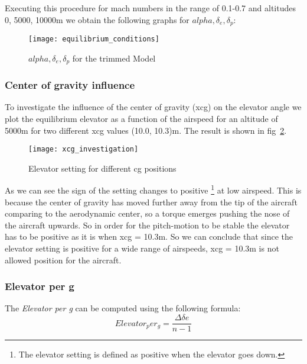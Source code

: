 Executing this procedure for mach numbers in the range of 0.1-0.7 and altitudes
0, 5000, 10000m we obtain the following graphs for $alpha, \delta_e,\delta_p$:

\begin{figure}[H]
    \centering
    \texttt{[image: equilibrium\_conditions]}
    \caption{$alpha, \delta_e,\delta_p$ for the trimmed Model}
\label{fig:equilibrium_conditions}
\end{figure}


\subsubsection{Center of gravity influence}
To investigate the influence of the center of gravity (xcg) on the elevator
angle we plot the equilibrium elevator as a function of the airspeed for
an altitude of 5000m  for two different xcg values (10.0, 10.3)m. 
The result is shown in fig~\ref{fig:xcg_investigation}.

\begin{figure}[H]
    \centering
    \texttt{[image: xcg\_investigation]}
    \caption{Elevator setting for different cg positions}
    \label{fig:xcg_investigation}
\end{figure}

As we can see the sign of the setting changes to positive
\footnote{The elevator setting is defined as positive when the elevator goes
down.} at low airspeed. This is because the center of gravity has moved further
away from the tip of the aircraft comparing to the aerodynamic center, so a
torque emerges pushing the nose of the aircraft upwards. So in order for the
pitch-motion to be stable the elevator has to be positive as it is when xcg =
10.3m. So we can conclude that since the elevator setting is positive for a wide
range of airspeeds, xcg = 10.3m is not allowed position for the
aircraft. 

\subsubsection{Elevator per g}
The \textit{Elevator per g} can be computed using the following formula:
\begin{equation}
    Elevator_per_g = \frac{\Delta \delta e}{n-1}
    \label{eqn:elevator_per_g}
\end{equation}

